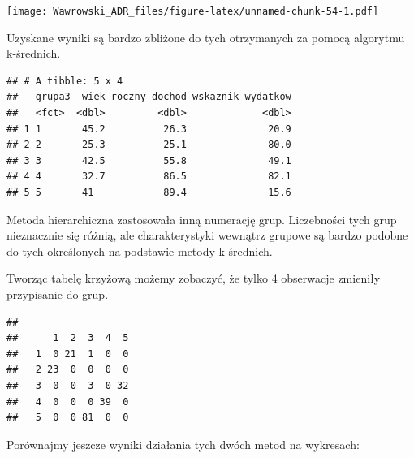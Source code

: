 \documentclass[]{book}
\newenvironment{Shaded}{\begin{snugshade}}{\end{snugshade}}
\newcommand{\DataTypeTok}[1]{\textcolor[rgb]{0.13,0.29,0.53}{#1}}
\newcommand{\KeywordTok}[1]{\textcolor[rgb]{0.13,0.29,0.53}{\textbf{#1}}}
\newcommand{\NormalTok}[1]{#1}
\newcommand{\OperatorTok}[1]{\textcolor[rgb]{0.81,0.36,0.00}{\textbf{#1}}}
\newcommand{\StringTok}[1]{\textcolor[rgb]{0.31,0.60,0.02}{#1}}
\begin{document}
\texttt{[image: Wawrowski\_ADR\_files/figure-latex/unnamed-chunk-54-1.pdf]}

Uzyskane wyniki są bardzo zbliżone do tych otrzymanych za pomocą algorytmu k-średnich.

\begin{Shaded}
\end{Shaded}

\begin{verbatim}
## # A tibble: 5 x 4
##   grupa3  wiek roczny_dochod wskaznik_wydatkow
##   <fct>  <dbl>         <dbl>             <dbl>
## 1 1       45.2          26.3              20.9
## 2 2       25.3          25.1              80.0
## 3 3       42.5          55.8              49.1
## 4 4       32.7          86.5              82.1
## 5 5       41            89.4              15.6
\end{verbatim}

Metoda hierarchiczna zastosowała inną numerację grup. Liczebności tych grup nieznacznie się różnią, ale charakterystyki wewnątrz grupowe są bardzo podobne do tych określonych na podstawie metody k-średnich.

Tworząc tabelę krzyżową możemy zobaczyć, że tylko 4 obserwacje zmieniły przypisanie do grup.

\begin{Shaded}
\end{Shaded}

\begin{verbatim}
##    
##      1  2  3  4  5
##   1  0 21  1  0  0
##   2 23  0  0  0  0
##   3  0  0  3  0 32
##   4  0  0  0 39  0
##   5  0  0 81  0  0
\end{verbatim}

Porównajmy jeszcze wyniki działania tych dwóch metod na wykresach:
\end{document}
